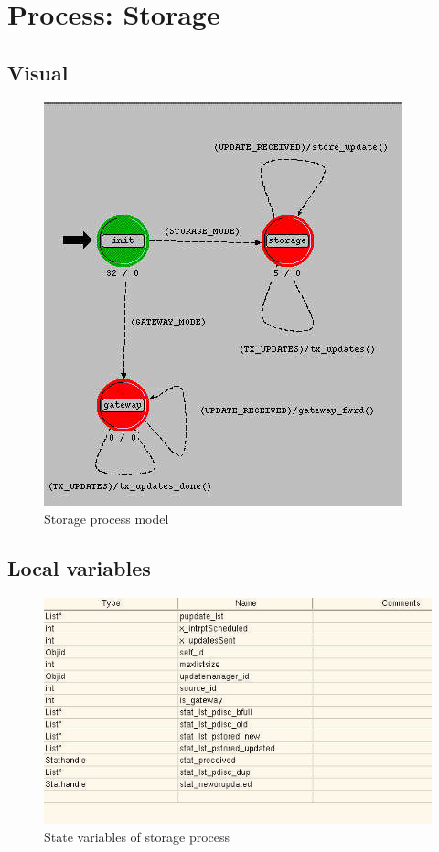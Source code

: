 
\section{Process: Storage}

\subsection{Visual}
\begin{figure}[ht]
    \centering
    \includegraphics[scale=0.5]{images/p_storage}
    \caption{Storage process model}
    \label{fig:appendix-b}
\end{figure}

\subsection{Local variables}
\begin{figure}[h]
    \centering
    \includegraphics[width=.7\textwidth]{images/state_variable_storage}
    \caption{State variables of storage process}
    \label{fig:appendix-b_sv}
\end{figure}


